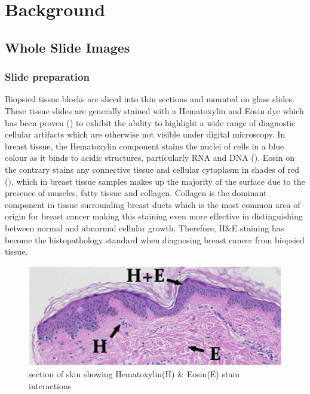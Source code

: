 \documentclass{l4proj}
\begin{document}
\chapter{Background}

\section{Whole Slide Images}
\subsection{Slide preparation}
Biopsied tissue blocks are sliced into thin sections and mounted on glass slides. These tissue slides are generally stained with a Hematoxylin and Eosin dye which has been proven (\textit{\cite{Bancroft2013}}) to exhibit the ability to highlight a wide range of diagnostic cellular artifacts which are otherwise not visible under digital microscopy.  In breast tissue, the Hematoxylin component stains the nuclei of cells in a blue colour as it binds to acidic structures, particularly RNA and DNA (\textit{\cite{chan2014wonderful}}). Eosin on the contrary stains any connective tissue and cellular cytoplasm in shades of red (\textit{\cite{Bancroft2013}}), which in breast tissue samples makes up the majority of the surface due to the presence of muscles, fatty tissue and collagen. Collagen is the dominant component in tissue surrounding breast ducts which is the most common area of origin for breast cancer making this staining even more effective in distinguishing between normal and abnormal cellular growth. Therefore, H\&E staining has become the histopathology standard when diagnosing breast cancer from biopsied tissue.

\begin{figure}[h]
\centering
\includegraphics[scale=1.2]{images/HE-stain-example.jpg}
\caption{section of skin showing Hematoxylin(H) \& Eosin(E) stain interactions}
\label{fig:HE-fig}
\end{figure}
\end{document}
